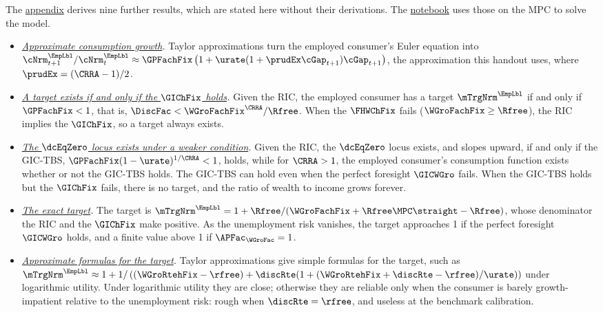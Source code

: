 \documentclass{econark}
\begin{document}
The \href{\AppendixPDF}{appendix} derives nine further results, which are stated here without their derivations.  The \href{https://github.com/llorracc/TractableBufferStock/blob/main/TractableBufferStock.ipynb}{notebook} uses those on the MPC to solve the model.
\begin{itemize}
\item \emph{\hyperref[sec:CGroApprox]{Approximate consumption growth}.}  Taylor approximations turn the employed consumer's Euler equation into ${\cNrm}^{\EmpLbl}_{t+1}/{\cNrm}^{\EmpLbl}_{t} \approx \GPFachFix\left(1+\urate(1+\prudEx\cGap_{t+1})\cGap_{t+1}\right)$, the approximation this handout uses, where $\prudEx = (\CRRA-1)/2$.
\item \emph{\hyperref[sec:mTargExists]{A target exists if and only if the $\GIChFix$ holds}.}  Given the RIC, the employed consumer has a target $\mTrgNrm^{\EmpLbl}$ if and only if $\GPFachFix < 1$, that is, $\DiscFac < \WGroFachFix^{\CRRA}/\Rfree$.  When the $\FHWChFix$ fails ($\WGroFachFix \geq \Rfree$), the RIC implies the $\GIChFix$, so a target always exists.
\item \emph{\hyperref[sec:TractableBufferStock-cLocusExists]{The $\dcEqZero$ locus exists under a weaker condition}.}  Given the RIC, the $\dcEqZero$ locus exists, and slopes upward, if and only if the GIC-TBS, $\GPFachFix(1-\urate)^{1/\CRRA} < 1$, holds, while for $\CRRA > 1$, the employed consumer's consumption function exists whether or not the GIC-TBS holds.  The GIC-TBS can hold even when the perfect foresight $\GICWGro$ fails.  When the GIC-TBS holds but the $\GIChFix$ fails, there is no target, and the ratio of wealth to income grows forever.
\item \emph{\hyperref[sec:mTargExact]{The exact target}.}  The target is $\mTrgNrm^{\EmpLbl} = 1 + \Rfree/(\WGroFachFix+\Rfree\MPC\straight-\Rfree)$, whose denominator the RIC and the $\GIChFix$ make positive.  As the unemployment risk vanishes, the target approaches 1 if the perfect foresight $\GICWGro$ holds, and a finite value above 1 if $\APFac_{\WGroFac} = 1$.
\item \emph{\hyperref[sec:mTargApprox]{Approximate formulas for the target}.}  Taylor approximations give simple formulas for the target, such as $\mTrgNrm^{\EmpLbl} \approx 1 + 1/\left((\WGroRtehFix-\rfree)+\discRte(1+(\WGroRtehFix+\discRte-\rfree)/\urate)\right)$ under logarithmic utility.  Under logarithmic utility they are close; otherwise they are reliable only when the consumer is barely growth-impatient relative to the unemployment risk: rough when $\discRte=\rfree$, and useless at the benchmark calibration.

\end{itemize}
\end{document}
